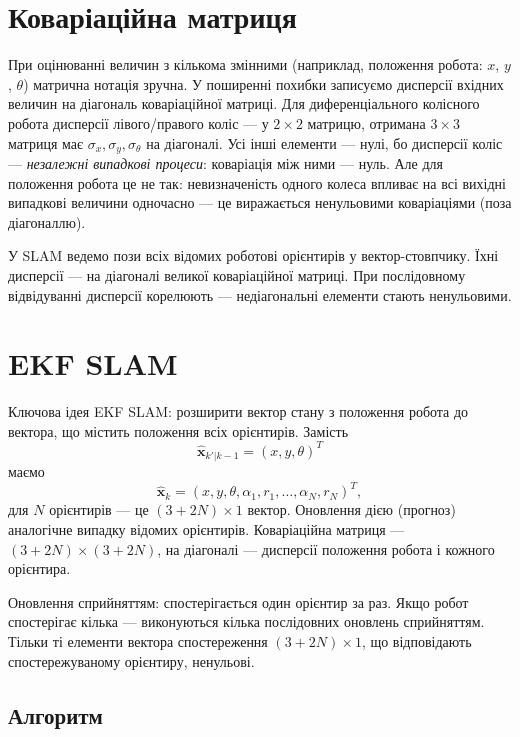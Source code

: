 \section{Коваріаційна матриця}
При оцінюванні величин з кількома змінними (наприклад, положення робота: $x$, $y$, $\theta$) матрична нотація зручна. У поширенні похибки записуємо дисперсії вхідних величин на діагональ коваріаційної матриці. Для диференціального колісного робота дисперсії лівого/правого коліс — у $2\times 2$ матрицю, отримана $3\times 3$ матриця має $\sigma_x, \sigma_y, \sigma_\theta$ на діагоналі. Усі інші елементи — нулі, бо дисперсії коліс — \emph{незалежні випадкові процеси}: коваріація між ними — нуль. Але для положення робота це не так: невизначеність одного колеса впливає на всі вихідні випадкові величини одночасно — це виражається ненульовими коваріаціями (поза діагоналлю).

У SLAM ведемо пози всіх відомих роботові орієнтирів у вектор-стовпчику. Їхні дисперсії — на діагоналі великої коваріаційної матриці. При послідовному відвідуванні дисперсії корелюють — недіагональні елементи стають ненульовими.

\section{EKF SLAM}\label{sec:ekfslam}
Ключова ідея EKF SLAM: розширити вектор стану з положення робота до вектора, що містить положення всіх орієнтирів. Замість
\begin{equation}
\hat{\boldsymbol{x}}_{k'|k-1}=(x,y,\theta)^T
\end{equation}
маємо
\begin{equation}
\hat{\boldsymbol{x}}_{k}=(x,y,\theta,\alpha_1,r_1,\ldots,\alpha_N,r_N)^T,
\end{equation}
для $N$ орієнтирів — це $(3+2N)\times 1$ вектор. Оновлення дією (прогноз) аналогічне випадку відомих орієнтирів. Коваріаційна матриця — $(3+2N)\times(3+2N)$, на діагоналі — дисперсії положення робота і кожного орієнтира.

Оновлення сприйняттям: спостерігається один орієнтир за раз. Якщо робот спостерігає кілька — виконуються кілька послідовних оновлень сприйняттям. Тільки ті елементи вектора спостереження $(3+2N)\times 1$, що відповідають спостережуваному орієнтиру, ненульові.

\subsection{Алгоритм}\label{sec:ekfslam_alg}

